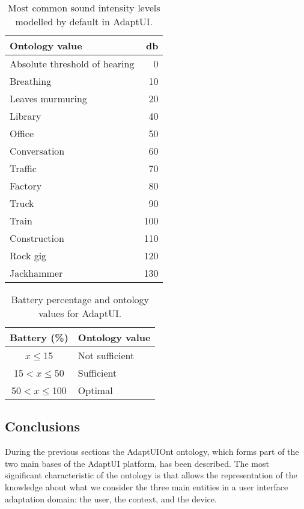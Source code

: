 \begin{table}[H]
  \caption{Most common sound intensity levels modelled by default in AdaptUI.}
 \label{tbl:sounds}
\footnotesize
\centering
 \begin{tabular}{l r}
  \hline 
  \textbf{Ontology value}	& \textbf{\ac{db}}\\
  \hline
  Absolute threshold of hearing	& 0	\\
  Breathing			& 10 	\\
  Leaves murmuring		& 20	\\
  Library			& 40	\\
  Office			& 50	\\
  Conversation			& 60	\\
  Traffic			& 70	\\
  Factory			& 80	\\
  Truck				& 90	\\
  Train				& 100	\\
  Construction			& 110	\\
  Rock gig			& 120	\\
  Jackhammer			& 130	\\
  \hline

\end{tabular}
\end{table}


\begin{table}[H]
  \caption{Battery percentage and ontology values for AdaptUI.}
 \label{tbl:batteries}
\footnotesize
\centering
 \begin{tabular}{c l}
  \hline 
  \textbf{Battery (\%)} 	& \textbf{Ontology value}	\\
  \hline  
  $x\leq$15			& Not sufficient		\\
  15$<x\leq$50			& Sufficient			\\
  50$<x\leq$100			& Optimal			\\
  \hline

\end{tabular}
\end{table}



\subsection{Conclusions}
\label{sec:model_conclusions}

During the previous sections the AdaptUIOnt ontology, which forms part of the two
main bases of the AdaptUI platform, has been described. The most significant
characteristic of the ontology is that allows the representation of the knowledge
about what we consider the three main entities in a user interface adaptation
domain: the user, the context, and the device. 

